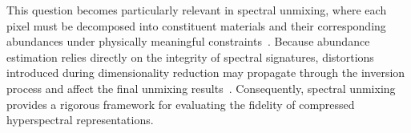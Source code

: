 \documentclass{article}
\begin{document}
This question becomes particularly relevant in spectral unmixing, where each pixel must be decomposed into constituent materials and their corresponding abundances under physically meaningful constraints~\cite{bioucas2012hyperspectral}. Because abundance estimation relies directly on the integrity of spectral signatures, distortions introduced during dimensionality reduction may propagate through the inversion process and affect the final unmixing results~\cite{hong2026hyperspectral, ren2026advances}. Consequently, spectral unmixing provides a rigorous framework for evaluating the fidelity of compressed hyperspectral representations.

\end{document}
